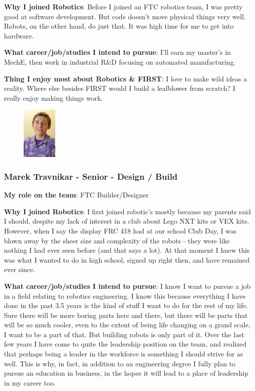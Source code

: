 {\bf Why I joined Robotics}: Before I joined an FTC robotics team, I was pretty good at software development. But code doesn't move physical things very well. Robots, on the other hand, do just that. It was high time for me to get into hardware.

{\bf What career/job/studies I intend to pursue}: I'll earn my master's in MechE, then work in industrial R\&D focusing on automated manufacturing.

{\bf Thing I enjoy most about Robotics \& FIRST}: I love to make wild ideas a reality. Where else besides FIRST would I build a leafblower from scratch? I really enjoy making things work.  

\begin{figure}
	\centering
	\includegraphics[height=1in]{marek}
\end{figure}
\subsubsection{Marek Travnikar - Senior - Design / Build} 
{\bf My role on the team}: FTC Builder/Designer 

{\bf Why I joined Robotics}: I first joined robotic's mostly because my parents said I should, despite my lack of interest in a club about Lego NXT kits or VEX kits. However, when I say the display FRC 418 had at our school Club Day, I was blown away by the sheer size and complexity of the robots - they were like nothing I had ever seen before (and that says a lot). At that moment I knew this was what I wanted to do in high school, signed up right then, and have remained ever since.

{\bf What career/job/studies I intend to pursue}: I know I want to pursue a job in a field relating to robotics engineering. I know this because everything I have done in the past 3.5 years is the kind of stuff I want to do for the rest of my life. Sure there will be more boring parts here and there, but there will be parts that will be so much cooler, even to the extent of being life changing on a grand scale, I want to be a part of that.  But building robots is only part of it. Over the last few years I have come to quite the leadership position on the team, and realized that perhaps being a leader in the workforce is something I should strive for as well. This is why, in fact, in addition to an engineering degree I fully plan to pursue an education in business, in the hopes it will lead to a place of leadership in my career too.

